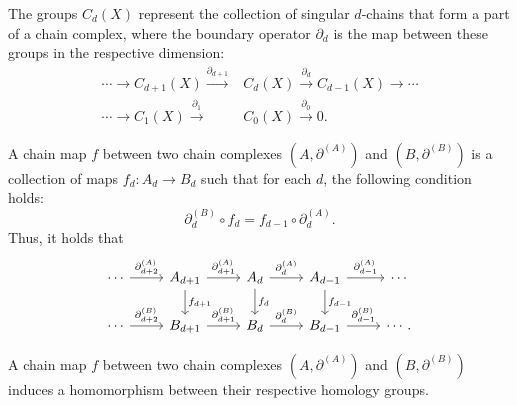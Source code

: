 \begin{example}
	The groups $C_{d}(X)$ represent the collection of singular $d$-chains that form
	a part of a chain complex, where the boundary operator $\partial_{d}$ is the map between these groups in the respective dimension:
	\begin{align}
		\cdots \xrightarrow{}C_{d+1}(X) \xrightarrow{\partial_{d+1}} & C_{d}(X) \xrightarrow{\partial_d}C_{d-1}(X) \xrightarrow{}\cdots \\
		\cdots \xrightarrow{}C_{1}(X) \xrightarrow{\partial_1}       & C_{0}(X) \xrightarrow{\partial_0}0.                              
	\end{align}
\end{example}

\begin{definition}
	A chain map $f$ between two chain complexes $(A, \partial^{(A)})$ and $(B,\partial
	^{(B)})$ is a collection of maps $f_{d}: A_{d} \rightarrow B_{d}$ such that for
	each $d$, the following condition holds:
	\begin{equation}
		\partial^{(B)}_{d}\circ f_{d} = f_{d-1}\circ \partial^{(A)}_{d}.
	\end{equation}
	Thus, it holds that
	\begin{equation}
		\begin{tikzcd}
			\cdots \arrow[r, "\partial^{(A)}_{d+2}"] & A_{d+1} \arrow[r, "\partial^{(A)}_{d+1}"]
			\arrow[d, "f_{d+1}"] & A_d \arrow[r, "\partial^{(A)}_{d}"] \arrow[d, "f_d"]
			& A_{d-1} \arrow[r, "\partial^{(A)}_{d-1}"] \arrow[d, "f_{d-1}"] & \cdots \\
			\cdots \arrow[r, "\partial^{(B)}_{d+2}"] & B_{d+1} \arrow[r, "\partial^{(B)}_{d+1}"]
			& B_d \arrow[r, "\partial^{(B)}_d"] & B_{d-1} \arrow[r, "\partial^{(B)}_{d-1}"]
			& \cdots.
		\end{tikzcd}
	\end{equation}
\end{definition}

\begin{theorem}{\cite[\S 1.3.1]{Weibel1994}}
	\label{chainmaps} A chain map $f$ between two chain complexes $(A, \partial^{(A)}
	)$ and $(B, \partial^{(B)})$ induces a homomorphism between their respective homology
	groups.
\end{theorem}

